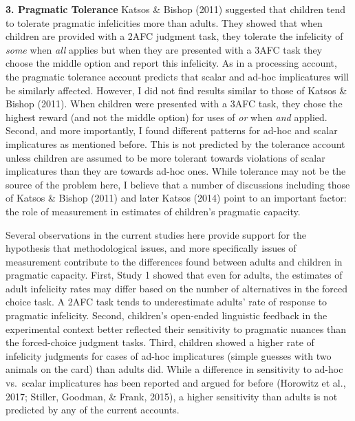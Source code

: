 \documentclass[oneside]{report}
\theoremstyle{definition}
\theoremstyle{definition}
\theoremstyle{definition}
\theoremstyle{remark}
\begin{document}
\textbf{3. Pragmatic Tolerance} Katsos \& Bishop (2011) suggested that
children tend to tolerate pragmatic infelicities more than adults. They
showed that when children are provided with a 2AFC judgment task, they
tolerate the infelicity of \emph{some} when \emph{all} applies but when
they are presented with a 3AFC task they choose the middle option and
report this infelicity. As in a processing account, the pragmatic
tolerance account predicts that scalar and ad-hoc implicatures will be
similarly affected. However, I did not find results similar to those of
Katsos \& Bishop (2011). When children were presented with a 3AFC task,
they chose the highest reward (and not the middle option) for uses of
\emph{or} when \emph{and} applied. Second, and more importantly, I found
different patterns for ad-hoc and scalar implicatures as mentioned
before. This is not predicted by the tolerance account unless children
are assumed to be more tolerant towards violations of scalar
implicatures than they are towards ad-hoc ones. While tolerance may not
be the source of the problem here, I believe that a number of
discussions including those of Katsos \& Bishop (2011) and later Katsos
(2014) point to an important factor: the role of measurement in
estimates of children's pragmatic capacity.

Several observations in the current studies here provide support for the
hypothesis that methodological issues, and more specifically issues of
measurement contribute to the differences found between adults and
children in pragmatic capacity. First, Study 1 showed that even for
adults, the estimates of adult infelicity rates may differ based on the
number of alternatives in the forced choice task. A 2AFC task tends to
underestimate adults' rate of response to pragmatic infelicity. Second,
children's open-ended linguistic feedback in the experimental context
better reflected their sensitivity to pragmatic nuances than the
forced-choice judgment tasks. Third, children showed a higher rate of
infelicity judgments for cases of ad-hoc implicatures (simple guesses
with two animals on the card) than adults did. While a difference in
sensitivity to ad-hoc vs.~scalar implicatures has been reported and
argued for before (Horowitz et al., 2017; Stiller, Goodman, \& Frank,
2015), a higher sensitivity than adults is not predicted by any of the
current accounts.
\end{document}
